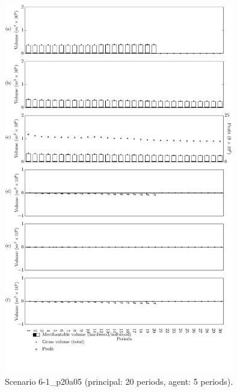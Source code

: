 \begin{figure}[h]
  \centering
  \includegraphics[width=10cm]{images/appendix/s6-1_p20a05}
  \caption{Scenario 6-1\_p20a05 (principal: 20 periods, agent: 5 periods).}
  \label{fig:s6-1_p20a05}
\end{figure}

